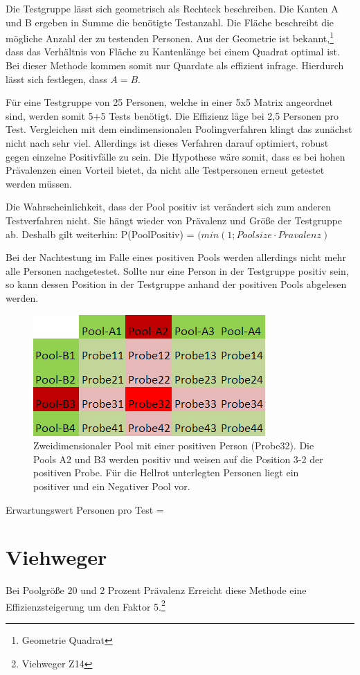 Die Testgruppe lässt sich geometrisch als Rechteck beschreiben.
Die Kanten A und B ergeben in Summe die benötigte Testanzahl.
Die Fläche beschreibt die mögliche Anzahl der zu testenden Personen.
Aus der Geometrie ist bekannt,\footnote{Geometrie Quadrat}
dass das Verhältnis von Fläche zu Kantenlänge bei einem Quadrat optimal ist.
Bei dieser Methode kommen somit nur Quardate als effizient infrage.
Hierdurch lässt sich festlegen, dass $A=B$.

Für eine Testgruppe von 25 Personen, welche in einer 5x5 Matrix angeordnet sind, werden somit 5+5 Tests benötigt.
Die Effizienz läge bei 2,5 Personen pro Test.
Vergleichen mit dem eindimensionalen Poolingverfahren klingt das zunächst nicht nach sehr viel.
Allerdings ist dieses Verfahren darauf optimiert, robust gegen einzelne Positivfälle zu sein.
Die Hypothese wäre somit, dass es bei hohen Prävalenzen einen Vorteil bietet, da nicht alle Testpersonen erneut getestet werden müssen.

Die Wahrscheinlichkeit, dass der Pool positiv ist verändert sich zum anderen Testverfahren nicht.
Sie hängt wieder von Prävalenz und Größe der Testgruppe ab.
Deshalb gilt weiterhin:
P(PoolPositiv) = $(min\left(1;Poolsize\cdot Pravalenz\right)$

Bei der Nachtestung im Falle eines positiven Pools werden allerdings nicht mehr alle Personen nachgetestet.
Sollte nur eine Person in der Testgruppe positiv sein, so kann dessen Position in der Testgruppe anhand der positiven Pools abgelesen werden.
\begin{figure}[h]
	\centering
	\includegraphics[height=.25\textwidth]{img/2d_Pool_1Positiv}
	\caption{Zweidimensionaler Pool mit einer positiven Person (Probe32). Die Pools A2 und B3 werden positiv und weisen auf die Position 3-2 der positiven Probe. Für die Hellrot unterlegten Personen liegt ein positiver und ein Negativer Pool vor.\footnotemark}
\end{figure}

Erwartungswert Personen pro Test =


\section{Viehweger}
Bei Poolgröße 20 und 2 Prozent Prävalenz Erreicht diese Methode eine Effizienzsteigerung um den Faktor 5.\footnote{Viehweger Z14}


